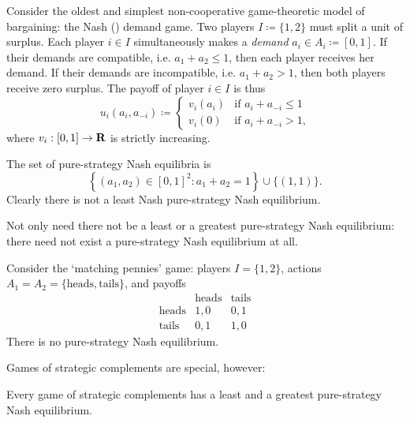 \begin{example}
	\label{example:nash_demand}
	Consider the oldest and simplest non-cooperative game-theoretic model of bargaining: the Nash (\citeyear{Nash1953}) demand game. Two players $I \coloneqq \{1,2\}$ must split a unit of surplus. Each player $i \in I$ simultaneously makes a \emph{demand} $a_i \in A_i \coloneqq [0,1]$. If their demands are compatible, i.e. $a_1+a_2 \leq 1$, then each player receives her demand. If their demands are incompatible, i.e. $a_1+a_2 > 1$, then both players receive zero surplus. The payoff of player $i \in I$ is thus
	\begin{equation*}
		u_i(a_i,a_{-i}) \coloneqq
		\begin{cases}
			v_i(a_i) & \text{if $a_i+a_{-i} \leq 1$} \\
			v_i(0) & \text{if $a_i+a_{-i} > 1$,} 
		\end{cases}
	\end{equation*}
	where $v_i : [0,1] \to \mathbf{R}$ is strictly increasing.

	The set of pure-strategy Nash equilibria is
	\begin{equation*}
		\left\{ (a_1,a_2) \in [0,1]^2 : a_1+a_2=1 \right\} \cup \{(1,1)\} .
	\end{equation*}
	Clearly there is not a least Nash pure-strategy Nash equilibrium.
\end{example}

Not only need there not be a least or a greatest pure-strategy Nash equilibrium: there need not exist a pure-strategy Nash equilibrium at all.

\begin{example}
	\label{example:pennies}
	Consider the `matching pennies' game: players $I=\{1,2\}$, actions $A_1 = A_2 = \{\text{heads},\text{tails}\}$, and payoffs
	\begin{equation*}
		\begin{array}{c|cc}
			  & \text{heads}   & \text{tails} \\ \hline
			\text{heads} & 1,0 & 0,1 \\
			\text{tails} & 0,1 & 1,0
		\end{array}
	\end{equation*}
	There is no pure-strategy Nash equilibrium.
\end{example}

Games of strategic complements are special, however:

\begin{theorem}
	\label{theorem:spm_game_nash}
	Every game of strategic complements has a least and a greatest pure-strategy Nash equilibrium.
\end{theorem}

